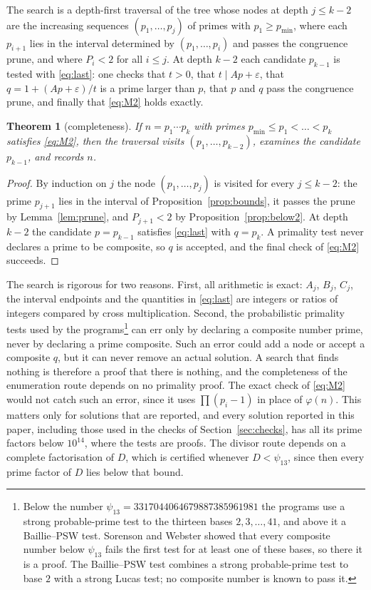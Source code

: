 \documentclass[11pt,reqno]{amsart}
\numberwithin{equation}{section}
\theoremstyle{plain}
\newtheorem{theorem}{Theorem}[section]
\theoremstyle{definition}
\theoremstyle{remark}
\begin{document}
The search is a depth-first traversal of the tree whose nodes at depth
$j\le k-2$ are the increasing sequences $(p_1,\dots,p_j)$ of primes
with $p_1\ge p_{\min}$, where each $p_{i+1}$ lies in the interval
determined by $(p_1,\dots,p_i)$ and passes the congruence prune, and
where $P_i<2$ for all $i\le j$. At depth $k-2$ each candidate
$p_{k-1}$ is tested with \eqref{eq:last}: one checks that $t>0$, that
$t\mid Ap+\varepsilon$, that $q=1+(Ap+\varepsilon)/t$ is a prime larger
than $p$, that $p$ and $q$ pass the congruence prune, and finally that
\eqref{eq:M2} holds exactly.

\begin{theorem}[completeness]\label{thm:complete}
If $n=p_1\cdots p_k$ with primes $p_{\min}\le p_1<\dots<p_k$ satisfies
\eqref{eq:M2}, then the traversal visits $(p_1,\dots,p_{k-2})$,
examines the candidate $p_{k-1}$, and records $n$.
\end{theorem}

\begin{proof}
By induction on $j$ the node $(p_1,\dots,p_j)$ is visited for every
$j\le k-2$: the prime $p_{j+1}$ lies in the interval of
Proposition~\ref{prop:bounds}, it passes the prune by
Lemma~\ref{lem:prune}, and $P_{j+1}<2$ by
Proposition~\ref{prop:below2}. At depth $k-2$ the candidate
$p=p_{k-1}$ satisfies \eqref{eq:last} with $q=p_k$. A primality test
never declares a prime to be composite, so $q$ is accepted, and the
final check of \eqref{eq:M2} succeeds.
\end{proof}

The search is rigorous for two reasons. First, all arithmetic is
exact:
$A_j$, $B_j$, $C_j$, the interval endpoints and the quantities in
\eqref{eq:last} are integers or ratios of integers compared by cross
multiplication. Second, the probabilistic primality tests used by the
programs\footnote{Below the number
$\psi_{13}=3317044064679887385961981$ the programs use a strong
probable-prime test to the thirteen bases $2,3,\dots,41$, and above it
a Baillie--PSW test. Sorenson and Webster \cite{SW17} showed that
every composite number below $\psi_{13}$ fails the first test for at
least one of these bases, so there it is a proof. The
Baillie--PSW test \cite{BW80,PSW80} combines a strong probable-prime
test to base $2$ with a strong Lucas test; no composite number is
known to pass it.} can err only by declaring a composite number prime,
never by declaring a prime composite. Such an error could add a node
or accept a composite $q$, but it can never remove an actual solution.
A search that finds nothing is therefore a proof that there is
nothing, and the completeness of the enumeration route depends on no
primality proof. The exact check of \eqref{eq:M2} would not catch such
an error, since it uses $\prod(p_i-1)$ in place of $\varphi(n)$. This
matters only for solutions that are reported, and every solution
reported in this paper, including those used in the checks of
Section~\ref{sec:checks}, has all its prime factors below $10^{14}$,
where the tests are proofs. The divisor route depends on a complete
factorisation of $D$, which is certified whenever $D<\psi_{13}$,
since then every prime factor of $D$ lies below that bound.
\end{document}
